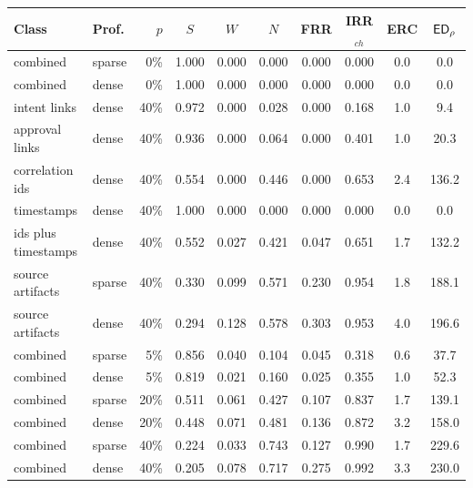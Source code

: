 \begin{tabular}{@{}llrccccccc@{}}
\toprule
\textbf{Class} & \textbf{Prof.} & $p$ & $S$ & $W$ & $N$ & \textbf{FRR} & \textbf{IRR$_{ch}$} & \textbf{ERC} & $\mathsf{ED}_\rho$ \\
\midrule
combined & sparse & 0\% & 1.000 & 0.000 & 0.000 & 0.000 & 0.000 & 0.0 & 0.0 \\
combined & dense & 0\% & 1.000 & 0.000 & 0.000 & 0.000 & 0.000 & 0.0 & 0.0 \\
intent links & dense & 40\% & 0.972 & 0.000 & 0.028 & 0.000 & 0.168 & 1.0 & 9.4 \\
approval links & dense & 40\% & 0.936 & 0.000 & 0.064 & 0.000 & 0.401 & 1.0 & 20.3 \\
correlation ids & dense & 40\% & 0.554 & 0.000 & 0.446 & 0.000 & 0.653 & 2.4 & 136.2 \\
timestamps & dense & 40\% & 1.000 & 0.000 & 0.000 & 0.000 & 0.000 & 0.0 & 0.0 \\
ids plus timestamps & dense & 40\% & 0.552 & 0.027 & 0.421 & 0.047 & 0.651 & 1.7 & 132.2 \\
source artifacts & sparse & 40\% & 0.330 & 0.099 & 0.571 & 0.230 & 0.954 & 1.8 & 188.1 \\
source artifacts & dense & 40\% & 0.294 & 0.128 & 0.578 & 0.303 & 0.953 & 4.0 & 196.6 \\
combined & sparse & 5\% & 0.856 & 0.040 & 0.104 & 0.045 & 0.318 & 0.6 & 37.7 \\
combined & dense & 5\% & 0.819 & 0.021 & 0.160 & 0.025 & 0.355 & 1.0 & 52.3 \\
combined & sparse & 20\% & 0.511 & 0.061 & 0.427 & 0.107 & 0.837 & 1.7 & 139.1 \\
combined & dense & 20\% & 0.448 & 0.071 & 0.481 & 0.136 & 0.872 & 3.2 & 158.0 \\
combined & sparse & 40\% & 0.224 & 0.033 & 0.743 & 0.127 & 0.990 & 1.7 & 229.6 \\
combined & dense & 40\% & 0.205 & 0.078 & 0.717 & 0.275 & 0.992 & 3.3 & 230.0 \\
\bottomrule
\end{tabular}
